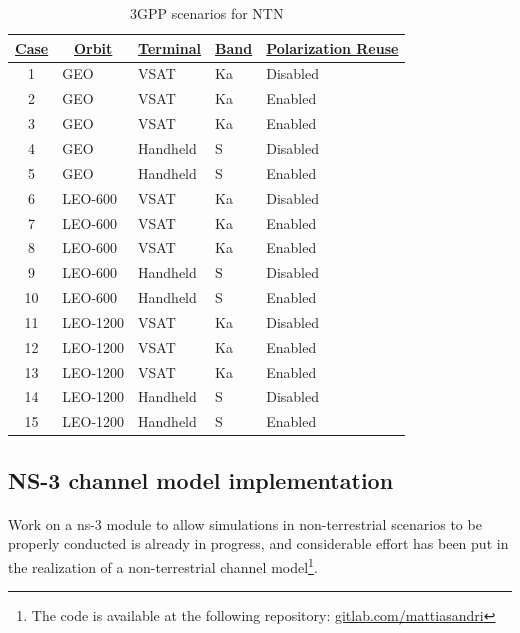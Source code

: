\begin{table}[]
    \begin{tabular}{cllll}
    \hline
    {\ul \textbf{Case}} & \multicolumn{1}{c}{{\ul \textbf{Orbit}}} & \multicolumn{1}{c}{{\ul \textbf{Terminal}}} & \multicolumn{1}{c}{{\ul \textbf{Band}}} & \multicolumn{1}{c}{{\ul \textbf{Polarization Reuse}}} \\ \hline
    1  & GEO      & VSAT     & Ka & Disabled \\ \hline
    2  & GEO      & VSAT     & Ka & Enabled  \\ \hline
    3  & GEO      & VSAT     & Ka & Enabled  \\ \hline
    4  & GEO      & Handheld & S  & Disabled \\ \hline
    5  & GEO      & Handheld & S  & Enabled  \\ \hline
    6  & LEO-600  & VSAT     & Ka & Disabled \\ \hline
    7  & LEO-600  & VSAT     & Ka & Enabled  \\ \hline
    8  & LEO-600  & VSAT     & Ka & Enabled  \\ \hline
    9  & LEO-600  & Handheld & S  & Disabled \\ \hline
    10 & LEO-600  & Handheld & S  & Enabled  \\ \hline
    11 & LEO-1200 & VSAT     & Ka & Disabled \\ \hline
    12 & LEO-1200 & VSAT     & Ka & Enabled  \\ \hline
    13 & LEO-1200 & VSAT     & Ka & Enabled  \\ \hline
    14 & LEO-1200 & Handheld & S  & Disabled \\ \hline
    15 & LEO-1200 & Handheld & S  & Enabled  \\ \hline
    \end{tabular}
    \caption{3GPP scenarios for NTN \label{tab:scenarios}}
    \end{table}

\subsection{NS-3 channel model implementation}

\paragraph{}
Work on a ns-3 module to allow simulations in non-terrestrial scenarios to be properly conducted is already in progress, and considerable effort has been put in the realization of a non-terrestrial channel model\footnote{The code is available at the following repository: \href{https://gitlab.com/mattiasandri/ns-3-ntn/-/tree/ntn-dev?ref_type=heads}{gitlab.com/mattiasandri}}.

